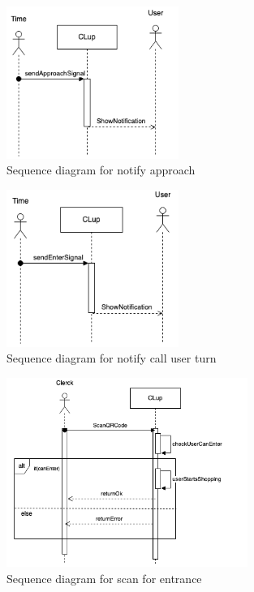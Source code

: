 \begin{figure}[H]
  \centering
  \includegraphics[width=0.5\textwidth,keepaspectratio]{images/NotifyApproach_sd.png}
  \caption{Sequence diagram for notify approach}
\end{figure}

\begin{figure}[H]
  \centering
  \includegraphics[width=0.5\textwidth,keepaspectratio]{images/NotifyCall_sd.png}
  \caption{Sequence diagram for notify call user turn}
\end{figure}

\begin{figure}[H]
  \centering
  \includegraphics[width=0.7\textwidth,keepaspectratio]{images/ScanQREntrance_sd.png}
  \caption{Sequence diagram for scan for entrance}
\end{figure}

